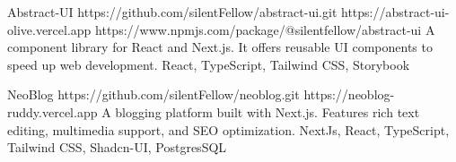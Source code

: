 \begin{tcolorbox}
\begin{minipage}[t]{0.7\textwidth}
\begin{tcolorbox}[grow to right by=0.75cm,height=0.8\textheight,colframe=white,colback=white]
                    \vspace{1em}

                    \cvproject
                      {Abstract-UI}
                      {https://github.com/silentFellow/abstract-ui.git}
                      {https://abstract-ui-olive.vercel.app}
                      {https://www.npmjs.com/package/@silentfellow/abstract-ui}
                      {A component library for React and Next.js. It offers reusable UI components to speed up web development.}
                      {React, TypeScript, Tailwind CSS, Storybook}

                    \vspace{1em}

                    \cvproject
                      {NeoBlog}
                      {https://github.com/silentFellow/neoblog.git}
                      {https://neoblog-ruddy.vercel.app}
                      {}
                      {A blogging platform built with Next.js. Features rich text editing, multimedia support, and SEO optimization.}
                      {NextJs, React, TypeScript, Tailwind CSS, Shadcn-UI, PostgresSQL}

                    \vspace{1em}

            \end{tcolorbox}
        \end{minipage}
    \end{tcolorbox}


